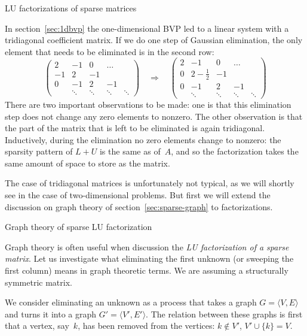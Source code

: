 {LU factorizations of sparse matrices}
\label{sec:fill}

In section~\ref{sec:1dbvp} the one-dimensional \ac{BVP} led to a
linear system with a tridiagonal coefficient matrix. If we do one
step of Gaussian elimination, the only element that needs to be
eliminated is in the second row:
\[
\begin{pmatrix}
  2&-1&0&\ldots\\ -1&2&-1\\ 0&-1&2&-1\\ 
  &\ddots&\ddots&\ddots&\ddots
\end{pmatrix}
\quad\Rightarrow\quad
\left(\begin{array}{c|cccc}
  2&-1&0&\ldots\\ \hline 0&2-\frac12&-1\\ 0&-1&2&-1\\ 
  &\ddots&\ddots&\ddots&\ddots
\end{array}\right)
\]
There are two important observations to be
made: one is that this elimination step does not change any zero
elements to nonzero. The other observation is that the part of the
matrix that is left to be eliminated is again
tridiagonal. Inductively, during the elimination no zero elements
change to nonzero: the sparsity pattern of $L+U$ is the same as
of~$A$, and so the factorization takes the same amount of space to
store as the matrix.

The case of tridiagonal matrices is unfortunately not typical, as we
will shortly see in the case of two-dimensional problems. But first we
will extend the discussion on graph theory of
section~\ref{sec:sparse-graph} to factorizations.

 {Graph theory of sparse LU factorization}
\label{sec:lu-graph}

Graph theory is often useful when discussion the
%
\emph{LU factorization of a sparse matrix}.
%
Let us investigate what eliminating the first unknown
(or sweeping the first column) means in graph theoretic terms. We are
assuming a structurally symmetric matrix.

We consider eliminating an unknown as a process
that takes a graph $G=\langle V,E\rangle$ and
turns it into a graph $G'=\langle V',E'\rangle$. The relation between
these graphs is first that a vertex, say~$k$,
has been removed from the vertices:
$k\not\in V'$, $V'\cup \{k\}=V$.

